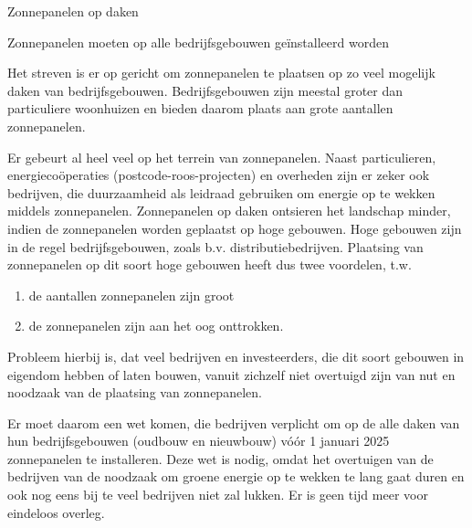 \begin{voorstel}{Zonnepanelen op daken}

\begin{samenvatting}
Zonnepanelen moeten op alle bedrijfsgebouwen geïnstalleerd worden
\end{samenvatting}

\begin{multicols*}{2}

\begin{uitdaging}
Het streven is er op gericht om zonnepanelen te plaatsen op zo veel mogelijk daken van bedrijfsgebouwen. Bedrijfsgebouwen zijn meestal groter dan particuliere woonhuizen en bieden daarom plaats aan grote aantallen zonnepanelen.
\end{uitdaging}

\begin{overwegingen}
Er gebeurt al heel veel op het terrein van zonnepanelen. Naast particulieren, energiecoöperaties (postcode-roos-projecten) en overheden zijn er zeker ook bedrijven, die duurzaamheid als leidraad gebruiken om energie op te wekken middels zonnepanelen. Zonnepanelen op daken ontsieren het landschap minder, indien de zonnepanelen worden geplaatst op hoge gebouwen. Hoge gebouwen zijn in de regel bedrijfsgebouwen, zoals b.v. distributiebedrijven. Plaatsing van zonnepanelen op dit soort hoge gebouwen heeft dus twee voordelen, t.w.

\begin{enumerate}
	\item de aantallen zonnepanelen zijn groot
	\item de zonnepanelen zijn aan het oog onttrokken.
\end{enumerate}

Probleem hierbij is, dat veel bedrijven en investeerders, die dit soort gebouwen in eigendom hebben of laten bouwen, vanuit zichzelf niet overtuigd zijn van nut en noodzaak van de plaatsing van zonnepanelen.
\end{overwegingen}

\begin{aanbevelingen}
Er moet daarom een wet komen, die bedrijven verplicht om op de alle daken van hun bedrijfsgebouwen (oudbouw en nieuwbouw) vóór 1 januari 2025 zonnepanelen te installeren. Deze wet is nodig, omdat het overtuigen van de bedrijven van de noodzaak om groene energie op te wekken te lang gaat duren en ook nog eens bij te veel bedrijven niet zal lukken. Er is geen tijd meer voor eindeloos overleg.
\end{aanbevelingen}

\end{multicols*}

\end{voorstel}
